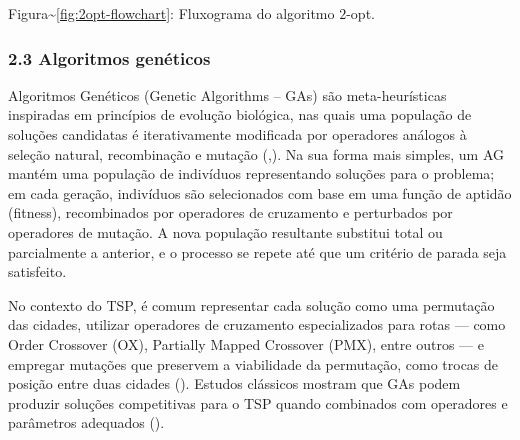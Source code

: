 Figura\textasciitilde{}\ref{fig:2opt-flowchart}: Fluxograma do algoritmo
\(2\)-opt.

\begin{Shaded}
\begin{Highlighting}[]


    
            

\end{Highlighting}
\end{Shaded}

\subsubsection{2.3 Algoritmos
genéticos}\label{sec-23-algoritmos-geneticos}

Algoritmos Genéticos (Genetic Algorithms -- GAs) são meta-heurísticas
inspiradas em princípios de evolução biológica, nas quais uma população
de soluções candidatas é iterativamente modificada por operadores
análogos à seleção natural, recombinação e mutação
(,).
Na sua forma mais simples, um AG mantém uma população de indivíduos
representando soluções para o problema; em cada geração, indivíduos são
selecionados com base em uma função de aptidão (fitness), recombinados
por operadores de cruzamento e perturbados por operadores de mutação. A
nova população resultante substitui total ou parcialmente a anterior, e
o processo se repete até que um critério de parada seja satisfeito.

No contexto do TSP, é comum representar cada solução como uma permutação
das cidades, utilizar operadores de cruzamento especializados para rotas
--- como Order Crossover (OX), Partially Mapped Crossover (PMX), entre
outros --- e empregar mutações que preservem a viabilidade da
permutação, como trocas de posição entre duas cidades
(). Estudos clássicos mostram que
GAs podem produzir soluções competitivas para o TSP quando combinados
com operadores e parâmetros adequados
().

